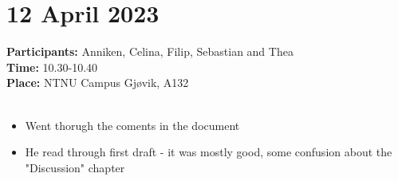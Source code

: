 \section{12 April 2023}
\textbf{Participants:} Anniken, Celina, Filip, Sebastian and Thea \\
\textbf{Time:} 10.30-10.40 \\
\textbf{Place:} NTNU Campus Gjøvik, A132
\\~\\
\begin{itemize}
    \item Went thorugh the coments in the document
    \item He read through first draft - it was mostly good, some confusion about the "Discussion" chapter
\end{itemize}